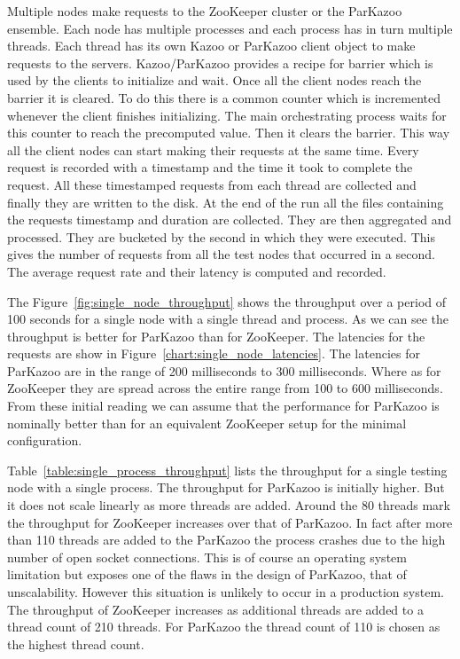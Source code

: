 Multiple nodes make requests to the ZooKeeper cluster or the ParKazoo ensemble. Each node has multiple processes and each process has in turn multiple threads. Each thread has its own Kazoo or ParKazoo client object to make requests to the servers. Kazoo/ParKazoo provides a recipe for barrier which is used by the clients to initialize and wait. Once all the client nodes reach the barrier it is cleared. To do this there is a common counter which is incremented whenever the client finishes initializing. The main orchestrating process waits for this counter to reach the precomputed value. Then it clears the barrier. This way all the client nodes can start making their requests at the same time. Every request is recorded with a timestamp and the time it took to complete the request. All these timestamped requests from each thread are collected and finally they are written to the disk. At the end of the run all the files containing the requests timestamp and duration are collected. They are then aggregated and processed. They are bucketed by the second in which they were executed. This gives the number of requests from all the test nodes that occurred in a second. The average request rate and their latency is computed and recorded. 





The Figure~\ref{fig:single_node_throughput} shows the throughput over a period of 100 seconds for a single node with a single thread and process. As we can see the throughput is better for ParKazoo than for ZooKeeper. The latencies for the requests are show in Figure~\ref{chart:single_node_latencies}. The latencies for ParKazoo are in the range of 200 milliseconds to 300 milliseconds. Where as for ZooKeeper they are spread across the entire range from 100 to 600 milliseconds. From these initial reading we can assume that the performance for ParKazoo is nominally better than for an equivalent ZooKeeper setup for the minimal configuration.



Table~\ref{table:single_process_throughput} lists the throughput for a single testing node with a single process. The throughput for ParKazoo is initially higher. But it does not scale linearly as more threads are added. Around the 80 threads mark the throughput for ZooKeeper increases over that of ParKazoo. In fact after more than 110 threads are added to the ParKazoo the process crashes due to the high number of open socket connections. This is of course an operating system limitation but exposes one of the flaws in the design of ParKazoo, that of unscalability. However this situation is unlikely to occur in a production system. The throughput of ZooKeeper increases as additional threads are added to a thread count of 210 threads. For ParKazoo the thread count of 110 is chosen as the highest thread count.

